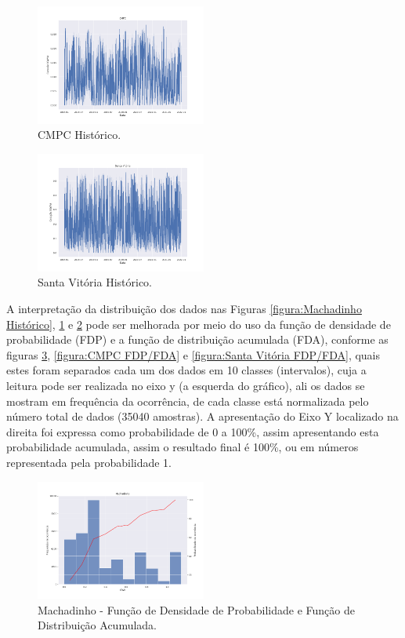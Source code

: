 \documentclass[conference]{IEEEtran}
\begin{document}
\begin{figure}[h]
\includegraphics[width=0.5\textwidth]{Figuras/CMPC_Historico.png}
\centering
\caption{CMPC Histórico.}
\label{figura:CMPC Histórico}
\end{figure}

\begin{figure}[h]
\includegraphics[width=0.5\textwidth]{Figuras/Santa_Vitoria_Historico.png}
\centering
\caption{Santa Vitória Histórico.}
\label{figura:Santa Vitória Histórico}
\end{figure}

A interpretação da distribuição dos dados nas Figuras \ref{figura:Machadinho Histórico}, \ref{figura:CMPC Histórico} e \ref{figura:Santa Vitória Histórico} pode ser melhorada por meio do uso da função de densidade de probabilidade (FDP) e a função de distribuição acumulada (FDA), conforme as figuras \ref{figura:Machadinho FDP/FDA}, \ref{figura:CMPC FDP/FDA} e \ref{figura:Santa Vitória FDP/FDA}, quais estes foram separados cada um dos dados em 10 classes (intervalos), cuja a leitura pode ser realizada no eixo y (a esquerda do gráfico), ali os dados se mostram em frequência da ocorrência, de cada classe está normalizada pelo número total de dados (35040 amostras). A apresentação do Eixo Y localizado na direita foi expressa como probabilidade de 0 a 100\%, assim apresentando esta probabilidade acumulada, assim o resultado final é 100\%, ou em números representada pela probabilidade 1.

\begin{figure}[h]
\includegraphics[width=0.5\textwidth]{Figuras/MACHADINHO.png}
\centering
\caption{Machadinho - Função de Densidade de Probabilidade e Função de Distribuição Acumulada.}
\label{figura:Machadinho FDP/FDA}
\end{figure}
\end{document}

